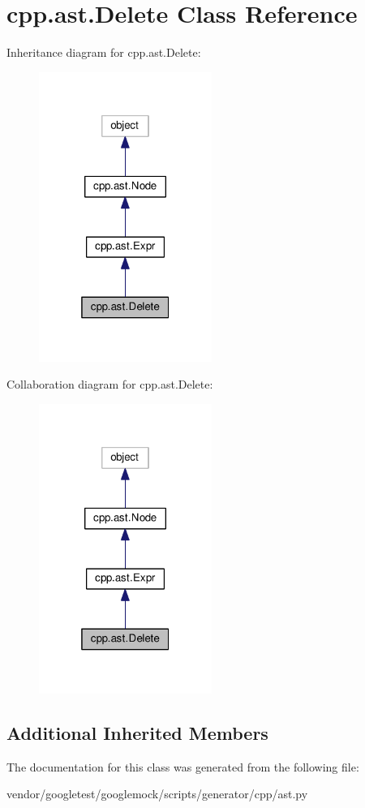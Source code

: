 \hypertarget{classcpp_1_1ast_1_1Delete}{}\section{cpp.\+ast.\+Delete Class Reference}
\label{classcpp_1_1ast_1_1Delete}


Inheritance diagram for cpp.\+ast.\+Delete\+:\nopagebreak
\begin{figure}[H]
\begin{center}
\leavevmode
\includegraphics[width=160pt]{classcpp_1_1ast_1_1Delete__inherit__graph}
\end{center}
\end{figure}


Collaboration diagram for cpp.\+ast.\+Delete\+:\nopagebreak
\begin{figure}[H]
\begin{center}
\leavevmode
\includegraphics[width=160pt]{classcpp_1_1ast_1_1Delete__coll__graph}
\end{center}
\end{figure}
\subsection*{Additional Inherited Members}


The documentation for this class was generated from the following file\+:\begin{DoxyCompactItemize}
\item 
vendor/googletest/googlemock/scripts/generator/cpp/ast.\+py\end{DoxyCompactItemize}
